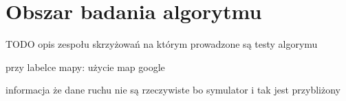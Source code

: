 \chapter{Obszar badania algorytmu}
TODO opis zespołu skrzyżowań na którym prowadzone są testy algorymu

przy labelce mapy: użycie map google \cite{google_maps}

informacja że dane ruchu nie są rzeczywiste bo symulator i tak jest przybliżony